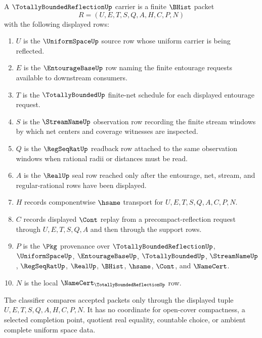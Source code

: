 \begin{definition}
\label{def:totally-bounded-reflection-carrier}
A $\TotallyBoundedReflectionUp$ carrier is a finite $\BHist$ packet
$$
R=(U,E,T,S,Q,A,H,C,P,N)
$$
with the following displayed rows:
\begin{enumerate}
\item $U$ is the $\UniformSpaceUp$ source row whose uniform carrier is being reflected.
\item $E$ is the $\EntourageBaseUp$ row naming the finite entourage requests available to downstream consumers.
\item $T$ is the $\TotallyBoundedUp$ finite-net schedule for each displayed entourage request.
\item $S$ is the $\StreamNameUp$ observation row recording the finite stream windows by which net centers and coverage witnesses are inspected.
\item $Q$ is the $\RegSeqRatUp$ readback row attached to the same observation windows when rational radii or distances must be read.
\item $A$ is the $\RealUp$ seal row reached only after the entourage, net, stream, and regular-rational rows have been displayed.
\item $H$ records componentwise $\hsame$ transport for $U,E,T,S,Q,A,C,P,N$.
\item $C$ records displayed $\Cont$ replay from a precompact-reflection request through $U,E,T,S,Q,A$ and then through the support rows.
\item $P$ is the $\Pkg$ provenance over $\TotallyBoundedReflectionUp$, $\UniformSpaceUp$, $\EntourageBaseUp$, $\TotallyBoundedUp$, $\StreamNameUp$, $\RegSeqRatUp$, $\RealUp$, $\BHist$, $\hsame$, $\Cont$, and $\NameCert$.
\item $N$ is the local $\NameCert_{\TotallyBoundedReflectionUp}$ row.
\end{enumerate}
The classifier compares accepted packets only through the displayed tuple $U,E,T,S,Q,A,H,C,P,N$. It has no coordinate for open-cover compactness, a selected completion point, quotient real equality, countable choice, or ambient complete uniform space data.
\end{definition}

